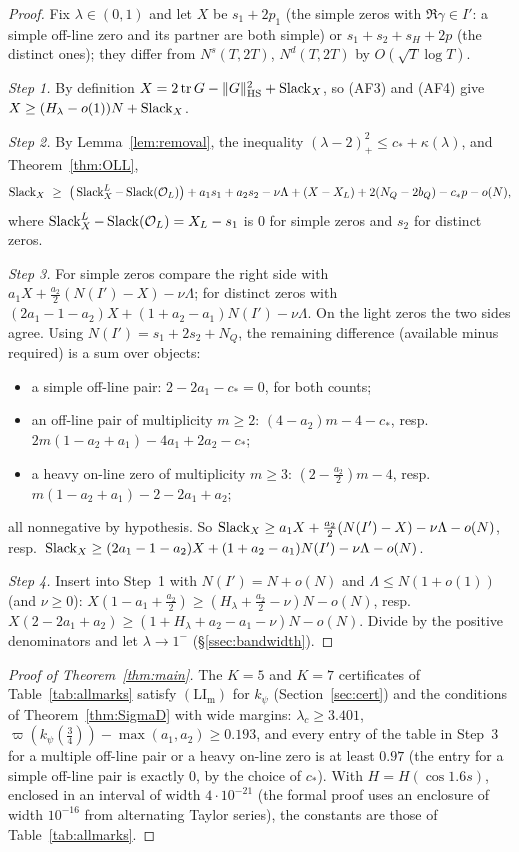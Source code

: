 \begin{proof}
Fix $\lambda\in(0,1)$ and let $X$ be $s_1+2p_1$ (the simple zeros with $\Re\gamma\in I'$: a simple off-line zero and its partner are both simple) or
$s_1+s_2+s_H+2p$ (the distinct ones); they differ from $N^s(T,2T)$, $N^d(T,2T)$ by $O(\sqrt T\log T)$.

\emph{Step 1.} By definition $X=2\operatorname{tr} G-\lVert G\rVert_{\mathrm{HS}}^2+\operatorname{Slack}_X$, so (AF3) and (AF4) give $X\ge(H_\lambda-o(1))N+\operatorname{Slack}_X$.

\emph{Step 2.} By Lemma~\ref{lem:removal}, the inequality $(\lambda-2)_+^2\le c_*+\kappa(\lambda)$, and Theorem~\ref{thm:OLL},
\[
\Slack_X\ \ge\ \big(\Slack^L_X-\Slack(\cO_L)\big)+a_1s_1+a_2s_2-\nu\Lambda+(X-X_L)+2(N_Q-2b_Q)-c_*p-o(N),
\]
where $\operatorname{Slack}^L_X-\operatorname{Slack}(\mathcal O_L)=X_L-s_1$ is $0$ for simple zeros and $s_2$ for distinct zeros.

\emph{Step 3.} For simple zeros compare the right side with $a_1X+\frac{a_2}2(N(I')-X)-\nu\Lambda$; for distinct zeros with
$(2a_1-1-a_2)X+(1+a_2-a_1)N(I')-\nu\Lambda$. On the light zeros the two sides agree. Using $N(I')=s_1+2s_2+N_Q$, the remaining difference (available
minus required) is a sum over objects:
\begin{itemize}
\item a simple off-line pair: $2-2a_1-c_*=0$, for both counts;
\item an off-line pair of multiplicity $m\ge2$: $(4-a_2)m-4-c_*$, resp.\ $2m(1-a_2+a_1)-4a_1+2a_2-c_*$;
\item a heavy on-line zero of multiplicity $m\ge3$: $(2-\frac{a_2}2)m-4$, resp.\ $m(1-a_2+a_1)-2-2a_1+a_2$;
\end{itemize}
all nonnegative by hypothesis. So $\operatorname{Slack}_X\ge a_1X+\frac{a_2}2(N(I')-X)-\nu\Lambda-o(N)$, resp.\
$\operatorname{Slack}_X\ge(2a_1-1-a_2)X+(1+a_2-a_1)N(I')-\nu\Lambda-o(N)$.

\emph{Step 4.} Insert into Step~1 with $N(I')=N+o(N)$ and $\Lambda\le N(1+o(1))$ (and $\nu\ge0$):
$X(1-a_1+\frac{a_2}2)\ge(H_\lambda+\frac{a_2}2-\nu)N-o(N)$, resp.\ $X(2-2a_1+a_2)\ge(1+H_\lambda+a_2-a_1-\nu)N-o(N)$. Divide by the positive
denominators and let $\lambda\to1^-$ (\S\ref{ssec:bandwidth}).
\end{proof}

\begin{proof}[Proof of Theorem~\ref{thm:main}]
The $K=5$ and $K=7$ certificates of Table~\ref{tab:allmarks} satisfy $(\mathrm{LI}_{\mathrm m})$ for $k_\psi$ (Section~\ref{sec:cert}) and the conditions of
Theorem~\ref{thm:SigmaD} with wide margins: $\lambda_c\ge3.401$, $\varpi(k_\psi(\frac34))-\max(a_1,a_2)\ge0.193$, and every entry of the table in
Step~3 for a multiple off-line pair or a heavy on-line zero is at least $0.97$ (the entry for a simple off-line pair is exactly $0$, by the
choice of $c_*$). With $H=H(\cos1.6s)$, enclosed in an interval of width
$4\cdot10^{-21}$ (the formal proof uses an enclosure of width $10^{-16}$ from alternating Taylor series), the constants are those of
Table~\ref{tab:allmarks}.
\end{proof}

